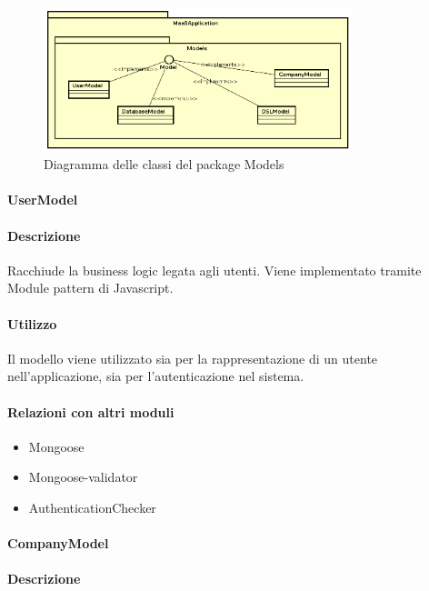 \begin{figure}[H]
\centering
\includegraphics[width=0.8\textwidth]{res/sections/backend/models.png}
\caption{Diagramma delle classi del package Models}
\end{figure}

\paragraph{UserModel}
\paragraph*{Descrizione}

Racchiude la business logic legata agli utenti. Viene implementato tramite Module pattern di Javascript. 

\paragraph*{Utilizzo}
Il modello viene utilizzato sia per la rappresentazione di un utente nell'applicazione, sia per l'autenticazione nel sistema.

\paragraph*{Relazioni con altri moduli}
\begin{itemize}
\item Mongoose
\item Mongoose-validator
\item AuthenticationChecker
\end{itemize}

\paragraph{CompanyModel}
\paragraph*{Descrizione}

